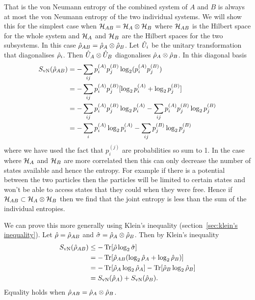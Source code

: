 \begin{enumerate}
        That is the von Neumann entropy of the combined system of \(A\) and \(B\) is always at most the von Neumann entropy of the two individual systems.
        We will show this for the simplest case when \(\mathcal{H}_{AB} = \mathcal{H}_A \otimes \mathcal{H}_B\) where \(\mathcal{H}_{AB}\) is the Hilbert space for the whole system and \(\mathcal{H}_A\) and \(\mathcal{H}_B\) are the Hilbert spaces for the two subsystems.
        In this case \(\hat{\rho}_{AB} = \hat{\rho}_A \otimes \hat{\rho}_B\).
        Let \(\hat{U}_i\) be the unitary transformation that diagonalises \(\hat{\rho}_i\).
        Then \(\hat{U}_A\otimes\hat{U}_B\) diagonalises \(\hat{\rho}_A \otimes \hat{\rho}_B\).
        In this diagonal basis
        \begin{align*}
            S_{\mathrm{vN}}(\hat{\rho}_{AB}) &= - \sum_{ij}p_i^{(A)}p_j^{(B)}\log_2 (p_i^{(A)}p_j^{(B)})\\
            &= -\sum_{ij}p_i^{(A)}p_j^{(B)}[\log_2 p_i^{(A)} + \log_2 p_j^{(B)}]\\
            &= -\sum_{ij} p_i^{(A)}p_j^{(B)}\log_2 p_i^{(A)} -\sum_{ij} p_i^{(A)}p_j^{(B)}\log_2 p_j^{(B)}\\
            &= -\sum_{i} p_i^{(A)}\log_2 p_i^{(A)} - \sum_{ij} p_j^{(B)}\log_2 p_j^{(B)}
        \end{align*}
        where we have used the fact that \(p_i^{(j)}\) are probabilities so sum to 1.
        In the case where \(\mathcal{H}_A\) and \(\mathcal{H}_B\) are more correlated then this can only decrease the number of states available and hence the entropy.
        For example if there is a potential between the two particles then the particles will be limited to certain states and won't be able to access states that they could when they were free.
        Hence if \(\mathcal{H}_{AB} \subset \mathcal{H}_A \otimes \mathcal{H}_B\) then we find that the joint entropy is less than the sum of the individual entropies.
        
        We can prove this more generally using Klein's inequality (section~\ref{sec:klein's inequality}).
        Let \(\hat{\rho} = \hat{\rho}_{AB}\) and \(\hat{\sigma} = \hat{\rho}_A\otimes\hat{\rho}_B\).
        Then by Klein's inequality
        \begin{align*}
            S_{\mathrm{vN}}(\hat{\rho}_{AB}) &\le
            -\Tr[\hat{\rho}\log_2\hat{\sigma}]\\
            &= -\Tr[\hat{\rho}_{AB}(\log_2\hat{\rho}_A + \log_2\hat{\rho}_B)]\\
            &= -\Tr[\hat{\rho}_A\log_2\hat{\rho}_A] - \Tr[\hat{\rho}_B\log_2 \hat{\rho}_B]\\
            &= S_{\mathrm{vN}}(\hat{\rho}_A) + S_{\mathrm{vN}}(\hat{\rho}_B).
        \end{align*}
        Equality holds when \(\hat{\rho}_{AB} = \hat{\rho}_A \otimes\hat{\rho}_B\).
        

\end{enumerate}
